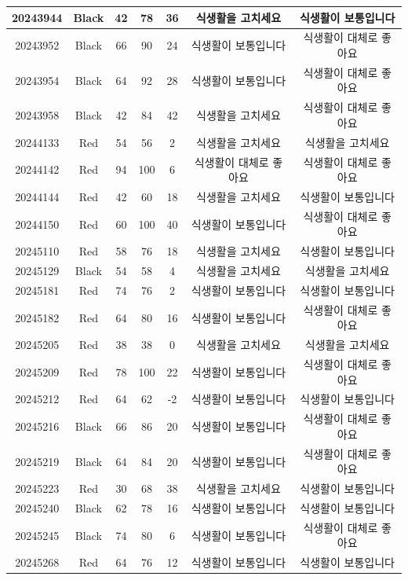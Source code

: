 \documentclass[
]{book}
\begin{document}
\begin{tabular}{c|c|c|c|c|c|c}
20243944 & Black & 42 & 78 & 36 & 식생활을 고치세요 & 식생활이 보통입니다\\
\hline
20243952 & Black & 66 & 90 & 24 & 식생활이 보통입니다 & 식생활이 대체로 좋아요\\
\hline
20243954 & Black & 64 & 92 & 28 & 식생활이 보통입니다 & 식생활이 대체로 좋아요\\
\hline
20243958 & Black & 42 & 84 & 42 & 식생활을 고치세요 & 식생활이 대체로 좋아요\\
\hline
20244133 & Red & 54 & 56 & 2 & 식생활을 고치세요 & 식생활을 고치세요\\
\hline
20244142 & Red & 94 & 100 & 6 & 식생활이 대체로 좋아요 & 식생활이 대체로 좋아요\\
\hline
20244144 & Red & 42 & 60 & 18 & 식생활을 고치세요 & 식생활이 보통입니다\\
\hline
20244150 & Red & 60 & 100 & 40 & 식생활이 보통입니다 & 식생활이 대체로 좋아요\\
\hline
20245110 & Red & 58 & 76 & 18 & 식생활을 고치세요 & 식생활이 보통입니다\\
\hline
20245129 & Black & 54 & 58 & 4 & 식생활을 고치세요 & 식생활을 고치세요\\
\hline
20245181 & Red & 74 & 76 & 2 & 식생활이 보통입니다 & 식생활이 보통입니다\\
\hline
20245182 & Red & 64 & 80 & 16 & 식생활이 보통입니다 & 식생활이 대체로 좋아요\\
\hline
20245205 & Red & 38 & 38 & 0 & 식생활을 고치세요 & 식생활을 고치세요\\
\hline
20245209 & Red & 78 & 100 & 22 & 식생활이 보통입니다 & 식생활이 대체로 좋아요\\
\hline
20245212 & Red & 64 & 62 & -2 & 식생활이 보통입니다 & 식생활이 보통입니다\\
\hline
20245216 & Black & 66 & 86 & 20 & 식생활이 보통입니다 & 식생활이 대체로 좋아요\\
\hline
20245219 & Black & 64 & 84 & 20 & 식생활이 보통입니다 & 식생활이 대체로 좋아요\\
\hline
20245223 & Red & 30 & 68 & 38 & 식생활을 고치세요 & 식생활이 보통입니다\\
\hline
20245240 & Black & 62 & 78 & 16 & 식생활이 보통입니다 & 식생활이 보통입니다\\
\hline
20245245 & Black & 74 & 80 & 6 & 식생활이 보통입니다 & 식생활이 대체로 좋아요\\
\hline
20245268 & Red & 64 & 76 & 12 & 식생활이 보통입니다 & 식생활이 보통입니다\\

\end{tabular}
\end{document}
